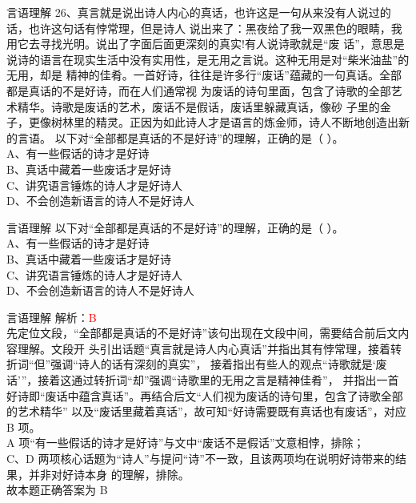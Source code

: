 \documentclass[aspectratio=169]{beamer}
\begin{document}
\begin{frame}[t]{言语理解}
26、真言就是说出诗人内心的真话，也许这是一句从来没有人说过的话，也许这句话有悖常理，但是诗人
说出来了：黑夜给了我一双黑色的眼睛，我用它去寻找光明。说出了字面后面更深刻的真实!有人说诗歌就是“废
话”，意思是说诗的语言在现实生活中没有实用性，是无用之言说。这种无用是对“柴米油盐”的无用，却是
精神的佳肴。一首好诗，往往是许多行“废话”蕴藏的一句真话。全部都是真话的不是好诗，而在人们通常视
为废话的诗句里面，包含了诗歌的全部艺术精华。诗歌是废话的艺术，废话不是假话，废话里躲藏真话，像砂
子里的金子，更像树林里的精灵。正因为如此诗人才是语言的炼金师，诗人不断地创造出新的言语。
以下对“全部都是真话的不是好诗”的理解，正确的是（ ）。\\
A、有一些假话的诗才是好诗\\
B、真话中藏着一些废话才是好诗\\
C、讲究语言锤炼的诗人才是好诗人\\
D、不会创造新语言的诗人不是好诗人\\
\end{frame}


\begin{frame}[t]{言语理解}
以下对“全部都是真话的不是好诗”的理解，正确的是（ ）。\\
A、有一些假话的诗才是好诗\\
B、真话中藏着一些废话才是好诗\\
C、讲究语言锤炼的诗人才是好诗人\\
D、不会创造新语言的诗人不是好诗人\\
\end{frame}





\begin{frame}[t]{言语理解}
    解析：\textcolor{red}{B}\\
    先定位文段，“全部都是真话的不是好诗”该句出现在文段中间，需要结合前后文内容理解。文段开
头引出话题“真言就是诗人内心真话”并指出其有悖常理，接着转折词“但”强调“诗人的话有深刻的真实”，
接着指出有些人的观点“诗歌就是‘废话’”，接着这通过转折词“却”强调“诗歌里的无用之言是精神佳肴”，
并指出一首好诗即“废话中蕴含真话”。再结合后文“人们视为废话的诗句里，包含了诗歌全部的艺术精华”
以及“废话里藏着真话”，故可知“好诗需要既有真话也有废话”，对应 B 项。\\
A 项“有一些假话的诗才是好诗”与文中“废话不是假话”文意相悖，排除；\\
C、D 两项核心话题为“诗人”与提问“诗”不一致，且该两项均在说明好诗带来的结果，并非对好诗本身
的理解，排除。\\
故本题正确答案为 B\\
\end{frame}
\end{document}
